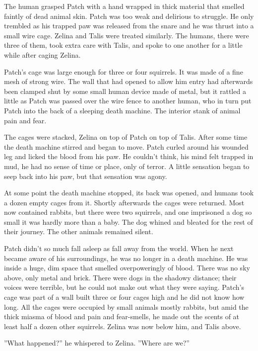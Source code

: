 \documentclass[12pt]{book}
\begin{document}
 The human grasped Patch with a hand wrapped in thick material that smelled faintly of dead animal skin. Patch was too weak and delirious to struggle. He only trembled as his trapped paw was released from the snare and he was thrust into a small wire cage. Zelina and Talis were treated similarly. The humans, there were three of them, took extra care with Talis, and spoke to one another for a little while after caging Zelina.\par
 Patch's cage was large enough for three or four squirrels. It was made of a fine mesh of strong wire. The wall that had opened to allow him entry had afterwards been clamped shut by some small human device made of metal, but it rattled a little as Patch was passed over the wire fence to another human, who in turn put Patch into the back of a sleeping death machine. The interior stank of animal pain and fear.\par
 The cages were stacked, Zelina on top of Patch on top of Talis. After some time the death machine stirred and began to move. Patch curled around his wounded leg and licked the blood from his paw. He couldn't think, his mind felt trapped in mud, he had no sense of time or place, only of terror. A little sensation began to seep back into his paw, but that sensation was agony.\par
At some point the death machine stopped, its back was opened, and humans took a dozen empty cages from it. Shortly afterwards the cages were returned. Most now contained rabbits, but there were two squirrels, and one imprisoned a dog so small it was hardly more than a baby. The dog whined and bleated for the rest of their journey. The other animals remained silent.\par
 Patch didn't so much fall asleep as fall away from the world. When he next became aware of his surroundings, he was no longer in a death machine. He was inside a huge, dim space that smelled overpoweringly of blood. There was no sky above, only metal and brick. There were dogs in the shadowy distance; their voices were terrible, but he could not make out what they were saying. Patch's cage was part of a wall built three or four cages high and he did not know how long. All the cages were occupied by small animals %
 mostly rabbits, but amid the thick miasma of blood and pain and fear-smells, he made out the scents of at least half a dozen other squirrels. Zelina was now below him, and Talis above.\par
 ''What happened?'' he whispered to Zelina. ''Where are we?''\par
\end{document}

